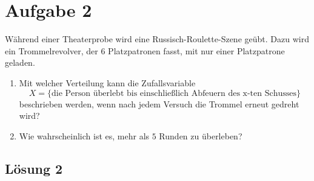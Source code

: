 \documentclass[main.tex]{subfiles}
\begin{document}
\section{Aufgabe 2}
Während einer Theaterprobe wird eine Russisch-Roulette-Szene geübt. Dazu wird ein Trommelrevolver, der $6$ Platzpatronen fasst, mit nur einer Platzpatrone geladen.
\begin{enumerate}
\item Mit welcher Verteilung kann die Zufallsvariable
 $$X = \{ \mbox{die Person überlebt bis einschließlich Abfeuern des x-ten Schusses} \}$$
 beschrieben werden, wenn nach jedem Versuch die Trommel erneut gedreht wird?
\item Wie wahrscheinlich ist es, mehr als $5$ Runden zu überleben?
\end{enumerate}

\subsection{Lösung 2}
\end{document}
